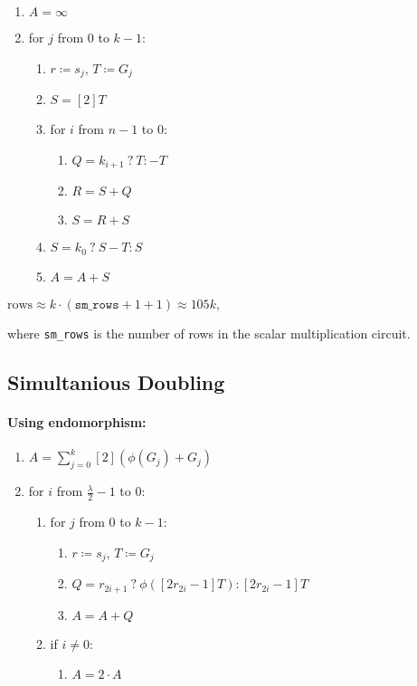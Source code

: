 \begin{enumerate}
	\item $A = \infty$
	\item for $j$ from $0$ to $k-1$:
	\begin{enumerate}
		\item $r \coloneqq s_j$, $T \coloneqq G_j$
		\item $S = [2]T$
		\item for $i$ from $n - 1$ to $0$:
		\begin{enumerate}
			\item $Q = k_{i + 1} \: ? \: T : -T$
			\item $R = S + Q$
			\item $S = R + S$
		\end{enumerate}
		\item $S = k_0 \: ? \: S - T : S$
		\item $A = A + S$
	\end{enumerate}
\end{enumerate}


\begin{center}
	$\text{rows} \approx k \cdot (\texttt{sm\_rows} + 1 + 1) \approx 105k$,
\end{center}
where \texttt{sm\_rows} is the number of rows in the scalar multiplication circuit. 

\subsection{Simultanious Doubling}
\paragraph{Using endomorphism:} 

\begin{enumerate}
	\item $A = \sum\limits_{j = 0}^{k} [2](\phi(G_j) + G_j)$
	\item for $i$ from $\frac{\lambda}{2} - 1$ to $0$:
	\begin{enumerate}
		\item for $j$ from $0$ to $k-1$:
		\begin{enumerate}
			\item $r \coloneqq s_j$, $T \coloneqq G_j$
			\item $Q = r_{2i + 1} \: ? \: \phi([2r_{2i} - 1]T) : [2r_{2i} - 1]T$
			\item $A = A + Q$
		\end{enumerate}
		\item if $i \neq 0$:
		\begin{enumerate}
			\item $A = 2 \cdot A$
		\end{enumerate}
	\end{enumerate}
\end{enumerate}

